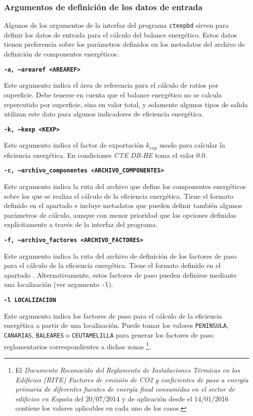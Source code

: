 \documentclass[10pt,notitlepage,oneside,a4paper]{article}
\begin{document}
\subsubsection{Argumentos de definición de los datos de entrada}

Algunos de los argumentos de la interfaz del programa \texttt{cteepbd} sirven para definir los datos de entrada para el cálculo del balance energético. Estos datos tienen preferencia sobre los parámetros definidos en los metadatos del archivo de definición de componentes energéticos.

\textbf{\texttt{-a, --arearef <AREAREF>}}

Este argumento indica el área de referencia para el cálculo de ratios por superficie. Debe tenerse en cuenta que el balance energético no se calcula repercutido por superficie, sino en valor total, y solamente algunos tipos de salida utilizan este dato para algunos indicadores de eficiencia energética.

\textbf{\texttt{-k, --kexp <KEXP>}}

Este argumento indica el factor de exportación $k_{exp}$ usado para calcular la eficiencia energética. En condiciones \textit{CTE DB-HE} toma el valor $0.0$.

\textbf{\texttt{-c, --archivo\_componentes <ARCHIVO\_COMPONENTES>}}

Este argumento indica la ruta del archivo que define los componentes energéticos sobre los que se realiza el cálculo de la eficiencia energética. Tiene el formato definido en el apartado  e incluye metadatos que pueden definir también algunos parámetros de cálculo, aunque con menor prioridad que las opciones definidas explícitamente a través de la interfaz del programa.

\textbf{\texttt{-f, --archivo\_factores <ARCHIVO\_FACTORES>}}

Este argumento indica la ruta del archivo de definición de los factores de paso para el cálculo de la eficiencia energética. Tiene el formato definido en el apartado .
Alternativamente, estos factores de paso pueden definirse mediante una localización (ver argumento \texttt{-l}).

\textbf{\texttt{-l LOCALIZACION}}

Este argumento indica los factores de paso para el cálculo de la eficiencia energética a partir de una localización. Puede tomar los valores \texttt{PENINSULA}, \texttt{CANARIAS}, \texttt{BALEARES} o \texttt{CEUTAMELILLA} para generar los factores de paso reglamentarios correspondientes a dichas zonas \footnote{El \textit{Documento Reconocido del Reglamento de Instalaciones Térmicas en los Edificios (RITE) Factores de emisión de CO2 y coeficientes de paso a energía primaria de diferentes fuentes de energía final consumidas en el sector de edificios en España} del 20/07/2014 y de aplicación desde el 14/01/2016 contiene los valores aplicables en cada uno de los casos.}.
\end{document}
